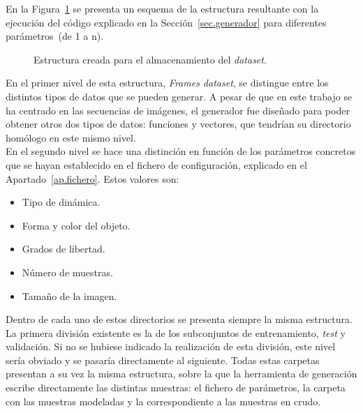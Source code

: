 En la Figura~\ref{fig.estructura_dataset} se presenta un esquema de la estructura resultante con la ejecución del código explicado en la Sección~\ref{sec.generador} para diferentes parámetros~(de 1 a n). 
\vspace{5pt}
\begin{figure}[H]
	\begin{center}
	    \setlength{\fboxsep}{0.5cm}
	    \caption{Estructura creada para el almacenamiento del \textit{dataset}.}
	    \label{fig.estructura_dataset}
	\end{center}
\end{figure}
\vspace{-10pt}
En el primer nivel de esta estructura, \textit{Frames dataset}, se distingue entre los distintos tipos de datos que se pueden generar. A pesar de que en este trabajo se ha centrado en las secuencias de imágenes, el generador fue diseñado para poder obtener otros dos tipos de datos: funciones y vectores, que tendrían su directorio homólogo en este mismo nivel.\\

En el segundo nivel se hace una distinción en función de los parámetros concretos que se hayan establecido en el fichero de configuración, explicado en el Apartado~\ref{ap.fichero}. Estos valores son:

\begin{itemize}
    \setlength\itemsep{1pt}
    \item Tipo de dinámica.
    \item Forma y color del objeto.
    \item Grados de libertad.
    \item Número de muestras.
    \item Tamaño de la imagen.
\end{itemize}

Dentro de cada uno de estos directorios se presenta siempre la misma estructura. La primera división existente es la de los subconjuntos de entrenamiento, \textit{test} y validación. Si no se hubiese indicado la realización de esta división, este nivel sería obviado y se pasaría directamente al siguiente. Todas estas carpetas presentan a su vez la misma estructura, sobre la que la herramienta de generación escribe directamente las distintas muestras: el fichero de parámetros, la carpeta con las muestras modeladas y la correspondiente a las muestras en crudo.

